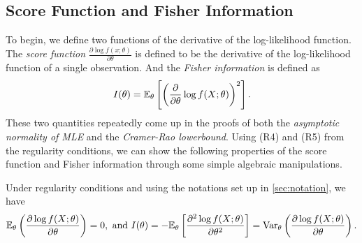 \subsection{Score Function and Fisher Information}
To begin, we define two functions of the derivative of the log-likelihood function. The \emph{score function} $\frac{\partial\log f(x;\theta)}{\partial\theta}$ is defined to be the derivative of the log-likelihood function of a single observation. And the \emph{Fisher information} is defined as
\begin{align}
I(\theta) = \mathbb{E}_{\theta}\left[ \left( \frac{\partial}{\partial\theta}\log f(X;\theta) \right)^2 \right]. \label{eqn:fisher}
\end{align}
These two quantities repeatedly come up in the proofs of both the \emph{asymptotic normality of MLE} and the \emph{Cramer-Rao lowerbound}. Using (R4) and (R5) from the regularity conditions, we can show the following properties of the score function and Fisher information through some simple algebraic manipulations.
\begin{lemma} \label{lem:2}
Under regularity conditions and using the notations set up in \cref{sec:notation}, we have
\begin{align*}
\mathbb{E}_\theta\left( \frac{\partial\log f(X;\theta)}{\partial \theta} \right) = 0, \text{ and }
I(\theta) = -\mathbb{E}_\theta\left[ \frac{\partial^2\log f(X;\theta)}{\partial \theta^2} \right] = \text{Var}_\theta\left( \frac{\partial\log f(X;\theta)}{\partial \theta} \right).
\end{align*}
\end{lemma}
